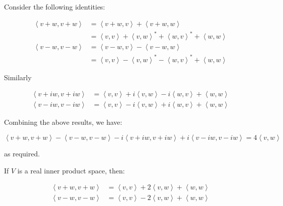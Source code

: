 \documentclass[12pt]{article}
\begin{document}

Consider the following identities:

\begin{equation}
\begin{split}
    \left\langle v + w, v + w \right\rangle &= \left\langle v + w, v \right\rangle + \left\langle v + w, w \right\rangle \\
    &= \left\langle v, v \right\rangle + \left\langle v, w \right\rangle^{*} + \left\langle w, v \right\rangle^{*} + \left\langle w, w \right\rangle \\
    \left\langle v - w, v - w \right\rangle &= \left\langle v - w, v \right\rangle - \left\langle v - w, w \right\rangle \\
    &= \left\langle v, v \right\rangle - \left\langle v, w \right\rangle^{*} - \left\langle w, v \right\rangle^{*} + \left\langle w, w \right\rangle
\end{split}
\end{equation}

Similarly

\begin{equation}
\begin{split}
    \left\langle v + iw, v + iw \right\rangle &= \left\langle v, v \right\rangle + i \left\langle v, w \right\rangle - i \left\langle w, v \right\rangle + \left\langle w, w \right\rangle \\
    \left\langle v - iw, v - iw \right\rangle &= \left\langle v, v \right\rangle - i \left\langle v, w \right\rangle + i \left\langle w, v \right\rangle + \left\langle w, w \right\rangle
\end{split}
\end{equation}

Combining the above results, we have:

\begin{equation}
    \left\langle v + w, v + w \right\rangle - \left\langle v - w, v - w \right\rangle - i \left\langle v + iw, v + iw \right\rangle + i \left\langle v - iw, v - iw \right\rangle = 4 \left\langle v, w \right\rangle
\end{equation}

as required.

If $V$ is a real inner product space, then:

\begin{equation}
\begin{split}
    \left\langle v + w, v + w \right\rangle &= \left\langle v, v \right\rangle + 2\left\langle v, w \right\rangle + \left\langle w, w \right\rangle \\
    \left\langle v - w, v - w \right\rangle &= \left\langle v, v \right\rangle - 2\left\langle v, w \right\rangle + \left\langle w, w \right\rangle
\end{split}
\end{equation}
\end{document}
